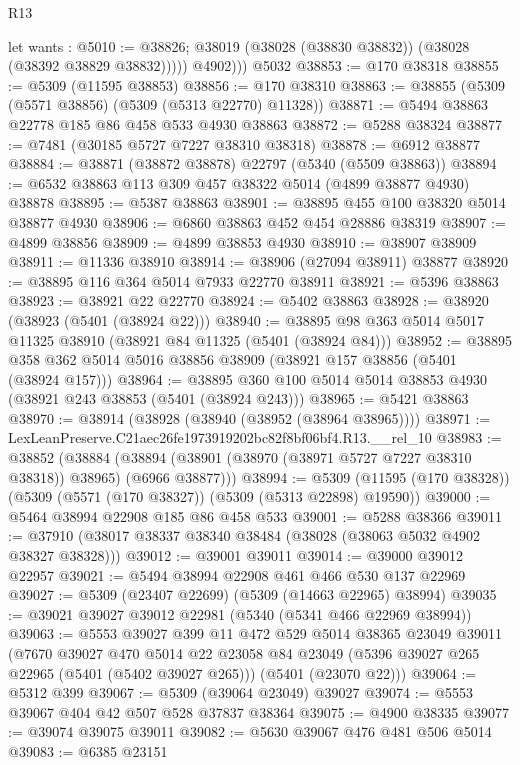 \begin{lexlean}{R13}
\begin{coremodule}
            let wants : @5010 := @38826;
            @38019 (@38028 (@38830 @38832)) (@38028 (@38392 @38829 @38832)))))
          @4902)))
    @5032
@38853 := @170 @38318
@38855 := @5309 (@11595 @38853)
@38856 := @170 @38310
@38863 := @38855 (@5309 (@5571 @38856) (@5309 (@5313 @22770) @11328))
@38871 := @5494 @38863 @22778 @185 @86 @458 @533 @4930 @38863
@38872 := @5288 @38324
@38877 := @7481 (@30185 @5727 @7227 @38310 @38318)
@38878 := @6912 @38877
@38884 := @38871 (@38872 @38878) @22797 (@5340 (@5509 @38863))
@38894 := @6532 @38863 @113 @309 @457 @38322 @5014 (@4899 @38877 @4930) @38878
@38895 := @5387 @38863
@38901 := @38895 @455 @100 @38320 @5014 @38877 @4930
@38906 := @6860 @38863 @452 @454 @28886 @38319
@38907 := @4899 @38856
@38909 := @4899 @38853 @4930
@38910 := @38907 @38909
@38911 := @11336 @38910
@38914 := @38906 (@27094 @38911) @38877
@38920 := @38895 @116 @364 @5014 @7933 @22770 @38911
@38921 := @5396 @38863
@38923 := @38921 @22 @22770
@38924 := @5402 @38863
@38928 := @38920 (@38923 (@5401 (@38924 @22)))
@38940 := @38895 @98 @363 @5014 @5017 @11325 @38910 (@38921 @84 @11325 (@5401 (@38924 @84)))
@38952 := @38895 @358 @362 @5014 @5016 @38856 @38909 (@38921 @157 @38856 (@5401 (@38924 @157)))
@38964 := @38895 @360 @100 @5014 @5014 @38853 @4930 (@38921 @243 @38853 (@5401 (@38924 @243)))
@38965 := @5421 @38863
@38970 := @38914 (@38928 (@38940 (@38952 (@38964 @38965))))
@38971 := LexLeanPreserve.C21aec26fe1973919202bc82f8bf06bf4.R13.__rel_10
@38983 := @38852
    (@38884 (@38894 (@38901 (@38970 (@38971 @5727 @7227 @38310 @38318)) @38965) (@6966 @38877)))
@38994 := @5309 (@11595 (@170 @38328)) (@5309 (@5571 (@170 @38327)) (@5309 (@5313 @22898) @19590))
@39000 := @5464 @38994 @22908 @185 @86 @458 @533
@39001 := @5288 @38366
@39011 := @37910 (@38017 @38337 @38340 @38484 (@38028 (@38063 @5032 @4902 @38327 @38328)))
@39012 := @39001 @39011
@39014 := @39000 @39012 @22957
@39021 := @5494 @38994 @22908 @461 @466 @530 @137 @22969
@39027 := @5309 (@23407 @22699) (@5309 (@14663 @22965) @38994)
@39035 := @39021 @39027 @39012 @22981 (@5340 (@5341 @466 @22969 @38994))
@39063 := @5553
    @39027
    @399
    @11
    @472
    @529
    @5014
    @38365
    @23049
    @39011
    (@7670
      @39027
      @470
      @5014
      @22
      @23058
      @84
      @23049
      (@5396 @39027 @265 @22965 (@5401 (@5402 @39027 @265)))
      (@5401 (@23070 @22)))
@39064 := @5312 @399
@39067 := @5309 (@39064 @23049) @39027
@39074 := @5553 @39067 @404 @42 @507 @528 @37837 @38364
@39075 := @4900 @38335
@39077 := @39074 @39075 @39011
@39082 := @5630 @39067 @476 @481 @506 @5014
@39083 := @6385 @23151

\end{coremodule}
\end{lexlean}
